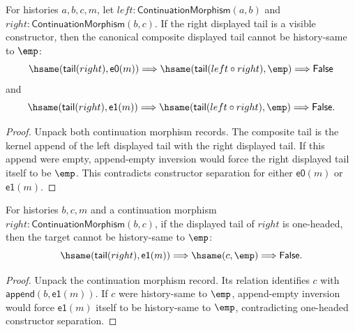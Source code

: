 \begin{theorem}
\label{thm:continuation-morphism-comp-right-visible-tail-empty-absurd}
For histories $a,b,c,m$, let $left:\mathsf{ContinuationMorphism}(a,b)$ and
$right:\mathsf{ContinuationMorphism}(b,c)$. If the right displayed tail is a
visible constructor, then the canonical composite displayed tail cannot be
history-same to $\emp$:
$$
\hsame(\mathsf{tail}(right),\mathsf{e0}(m))
\Longrightarrow
\hsame(\mathsf{tail}(left\circ right),\emp)\Longrightarrow\mathsf{False}
$$
and
$$
\hsame(\mathsf{tail}(right),\mathsf{e1}(m))
\Longrightarrow
\hsame(\mathsf{tail}(left\circ right),\emp)\Longrightarrow\mathsf{False}.
$$
\end{theorem}
\begin{proof}
Unpack both continuation morphism records. The composite tail is the kernel
append of the left displayed tail with the right displayed tail. If this append
were empty, append-empty inversion would force the right displayed tail itself
to be $\emp$. This contradicts constructor separation for either
$\mathsf{e0}(m)$ or $\mathsf{e1}(m)$.
\end{proof}

\begin{theorem}
\label{thm:continuation-morphism-right-visible-tail-target-not-empty}
For histories $b,c,m$ and a continuation morphism
$right:\mathsf{ContinuationMorphism}(b,c)$, if the displayed tail of $right$ is
one-headed, then the target cannot be history-same to $\emp$:
$$
\hsame(\mathsf{tail}(right),\mathsf{e1}(m))
\Longrightarrow
\hsame(c,\emp)
\Longrightarrow
\mathsf{False}.
$$
\end{theorem}
\begin{proof}
Unpack the continuation morphism record. Its relation identifies $c$ with
$\mathsf{append}(b,\mathsf{e1}(m))$. If $c$ were history-same to $\emp$,
append-empty inversion would force $\mathsf{e1}(m)$ itself to be history-same to
$\emp$, contradicting one-headed constructor separation.
\end{proof}


